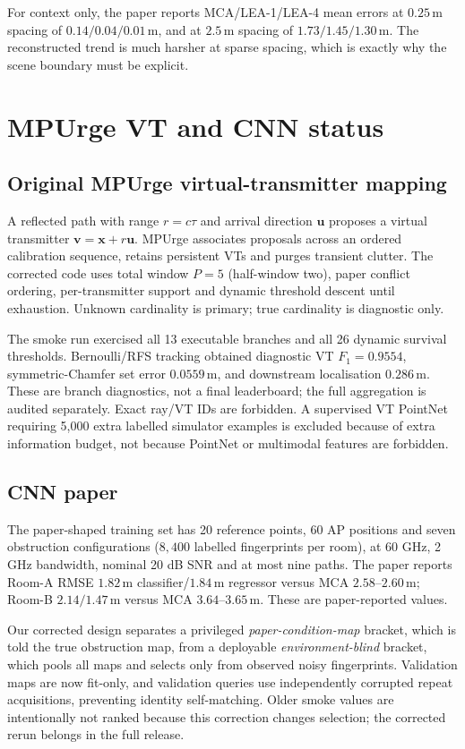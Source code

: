 \documentclass[10pt,a4paper]{article}
\newcommand{\m}{\,\mathrm{m}}
\newcommand{\paper}{\textcolor{blue!60!black}{paper-reported}}
\newcommand{\diag}{\textcolor{orange!70!black}{diagnostic}}
\begin{document}
For context only, the paper reports MCA/LEA-1/LEA-4 mean errors at $0.25\m$ spacing of $0.14/0.04/0.01\m$, and at $2.5\m$ spacing of $1.73/1.45/1.30\m$. The reconstructed trend is much harsher at sparse spacing, which is exactly why the scene boundary must be explicit.

\section{MPUrge VT and CNN status}
\subsection{Original MPUrge virtual-transmitter mapping}
A reflected path with range $r=c\tau$ and arrival direction $\mathbf u$ proposes a virtual transmitter $\mathbf v=\mathbf x+r\mathbf u$. MPUrge associates proposals across an ordered calibration sequence, retains persistent VTs and purges transient clutter. The corrected code uses total window $P=5$ (half-window two), paper conflict ordering, per-transmitter support and dynamic threshold descent until exhaustion. Unknown cardinality is primary; true cardinality is diagnostic only.

The smoke run exercised all 13 executable branches and all 26 dynamic survival thresholds. Bernoulli/RFS tracking obtained \diag{} VT $F_1=0.9554$, symmetric-Chamfer set error $0.0559\m$, and downstream localisation $0.286\m$. These are branch diagnostics, not a final leaderboard; the full aggregation is audited separately. Exact ray/VT IDs are forbidden. A supervised VT PointNet requiring 5,000 extra labelled simulator examples is excluded because of extra information budget, not because PointNet or multimodal features are forbidden.

\subsection{CNN paper}
The paper-shaped training set has 20 reference points, 60 AP positions and seven obstruction configurations ($8{,}400$ labelled fingerprints per room), at 60 GHz, 2 GHz bandwidth, nominal 20 dB SNR and at most nine paths. The paper reports Room-A RMSE $1.82\m$ classifier/$1.84\m$ regressor versus MCA $2.58$--$2.60\m$; Room-B $2.14/1.47\m$ versus MCA $3.64$--$3.65\m$. These are \paper{} values.

Our corrected design separates a privileged \emph{paper-condition-map} bracket, which is told the true obstruction map, from a deployable \emph{environment-blind} bracket, which pools all maps and selects only from observed noisy fingerprints. Validation maps are now fit-only, and validation queries use independently corrupted repeat acquisitions, preventing identity self-matching. Older smoke values are intentionally not ranked because this correction changes selection; the corrected rerun belongs in the full release.
\end{document}
